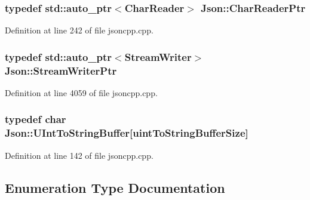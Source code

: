 \subsubsection[{\texorpdfstring{Char\+Reader\+Ptr}{CharReaderPtr}}]{\setlength{\rightskip}{0pt plus 5cm}typedef std\+::auto\+\_\+ptr$<$Char\+Reader$>$ {\bf Json\+::\+Char\+Reader\+Ptr}}\hypertarget{namespace_json_a4724efb8d41614b47036cb8b54233837}{}\label{namespace_json_a4724efb8d41614b47036cb8b54233837}


Definition at line 242 of file jsoncpp.\+cpp.

\subsubsection[{\texorpdfstring{Stream\+Writer\+Ptr}{StreamWriterPtr}}]{\setlength{\rightskip}{0pt plus 5cm}typedef std\+::auto\+\_\+ptr$<$Stream\+Writer$>$ {\bf Json\+::\+Stream\+Writer\+Ptr}}\hypertarget{namespace_json_a7132404aeebfc96d7c6ad2c66260afb5}{}\label{namespace_json_a7132404aeebfc96d7c6ad2c66260afb5}


Definition at line 4059 of file jsoncpp.\+cpp.

\subsubsection[{\texorpdfstring{U\+Int\+To\+String\+Buffer}{UIntToStringBuffer}}]{\setlength{\rightskip}{0pt plus 5cm}typedef char Json\+::\+U\+Int\+To\+String\+Buffer\mbox{[}{\bf uint\+To\+String\+Buffer\+Size}\mbox{]}}\hypertarget{namespace_json_a602bcf69c2042fb61c3b243cb16f04ca}{}\label{namespace_json_a602bcf69c2042fb61c3b243cb16f04ca}


Definition at line 142 of file jsoncpp.\+cpp.



\subsection{Enumeration Type Documentation}
